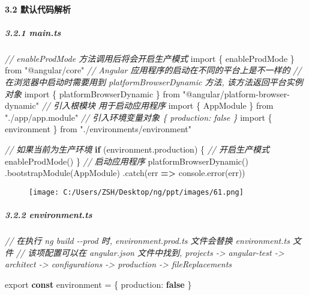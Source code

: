 \documentclass[
]{article}
\newenvironment{Shaded}{}{}
\newcommand{\AttributeTok}[1]{\textcolor[rgb]{0.49,0.56,0.16}{#1}}
\newcommand{\BuiltInTok}[1]{#1}
\newcommand{\CommentTok}[1]{\textcolor[rgb]{0.38,0.63,0.69}{\textit{#1}}}
\newcommand{\ControlFlowTok}[1]{\textcolor[rgb]{0.00,0.44,0.13}{\textbf{#1}}}
\newcommand{\DataTypeTok}[1]{\textcolor[rgb]{0.56,0.13,0.00}{#1}}
\newcommand{\FunctionTok}[1]{\textcolor[rgb]{0.02,0.16,0.49}{#1}}
\newcommand{\ImportTok}[1]{#1}
\newcommand{\KeywordTok}[1]{\textcolor[rgb]{0.00,0.44,0.13}{\textbf{#1}}}
\newcommand{\NormalTok}[1]{#1}
\newcommand{\OperatorTok}[1]{\textcolor[rgb]{0.40,0.40,0.40}{#1}}
\newcommand{\StringTok}[1]{\textcolor[rgb]{0.25,0.44,0.63}{#1}}
\begin{document}
\hypertarget{32-ux9ed8ux8ba4ux4ee3ux7801ux89e3ux6790}{%
\paragraph{3.2
默认代码解析}\label{32-ux9ed8ux8ba4ux4ee3ux7801ux89e3ux6790}}

\hypertarget{321-maints}{%
\subparagraph{3.2.1 main.ts}\label{321-maints}}

\begin{Shaded}
\begin{Highlighting}[]
\CommentTok{// enableProdMode 方法调用后将会开启生产模式}
\ImportTok{import}\NormalTok{ \{ enableProdMode \} }\ImportTok{from} \StringTok{"@angular/core"}
\CommentTok{// Angular 应用程序的启动在不同的平台上是不一样的}
\CommentTok{// 在浏览器中启动时需要用到 platformBrowserDynamic 方法, 该方法返回平台实例对象}
\ImportTok{import}\NormalTok{ \{ platformBrowserDynamic \} }\ImportTok{from} \StringTok{"@angular/platform{-}browser{-}dynamic"}
\CommentTok{// 引入根模块 用于启动应用程序}
\ImportTok{import}\NormalTok{ \{ AppModule \} }\ImportTok{from} \StringTok{"./app/app.module"}
\CommentTok{// 引入环境变量对象 \{ production: false \}}
\ImportTok{import}\NormalTok{ \{ environment \} }\ImportTok{from} \StringTok{"./environments/environment"}

\CommentTok{// 如果当前为生产环境}
\ControlFlowTok{if}\NormalTok{ (environment}\OperatorTok{.}\AttributeTok{production}\NormalTok{) \{}
  \CommentTok{// 开启生产模式}
  \FunctionTok{enableProdMode}\NormalTok{()}
\NormalTok{\}}
\CommentTok{// 启动应用程序}
\FunctionTok{platformBrowserDynamic}\NormalTok{()}
  \OperatorTok{.}\FunctionTok{bootstrapModule}\NormalTok{(AppModule)}
  \OperatorTok{.}\FunctionTok{catch}\NormalTok{(err }\KeywordTok{=\textgreater{}} \BuiltInTok{console}\OperatorTok{.}\FunctionTok{error}\NormalTok{(err))}
\end{Highlighting}
\end{Shaded}

\begin{figure}
\centering
\texttt{[image: C:/Users/ZSH/Desktop/ng/ppt/images/61.png]}
\caption{}
\end{figure}

\hypertarget{322-environmentts}{%
\subparagraph{3.2.2 environment.ts}\label{322-environmentts}}

\begin{Shaded}
\begin{Highlighting}[]
\CommentTok{// 在执行 \textasciigrave{}ng build {-}{-}prod\textasciigrave{} 时, environment.prod.ts 文件会替换 environment.ts 文件}
\CommentTok{// 该项配置可以在 angular.json 文件中找到, projects {-}\textgreater{} angular{-}test {-}\textgreater{} architect {-}\textgreater{} configurations {-}\textgreater{} production {-}\textgreater{} fileReplacements}

\ImportTok{export} \KeywordTok{const}\NormalTok{ environment }\OperatorTok{=}\NormalTok{ \{}
  \DataTypeTok{production}\OperatorTok{:} \KeywordTok{false}
\NormalTok{\}}
\end{Highlighting}
\end{Shaded}
\end{document}
